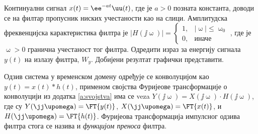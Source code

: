 \PID 
Континуални сигнал $x(t) = \ee^{-at} \uu(t)$, где је $a > 0$ позната константа, 
доводи се на филтар пропусник ниских учестаности као на слици. 
Амплитудска фреквенцијска карактеристика филтра је 
$|H(\jj\upomega)| = \begin{cases}
    1 ,& |\upomega| \leq \upomega_0 \\
    0 ,& \text{иначе}
\end{cases}$, где је $\upomega > 0$ гранична учестаност тог филтра.
Одредити израз за енергију сигнала $y(t)$ на излазу филтра, $W_y$. Добијени резултат
графички представити.

\RESENJE
Одзив система у временском домену одређује се конволуцијом као $y(t) = x(t) \ast h(t)$, применом својства Фуријеове трансформације о конволуцији из додатка 
\ref{a:svojstva} има се veza $Y(\jj\upomega) = X(\jj\upomega) \cdot H(\jj\upomega)$, где су 
$Y(\jj\upomega) = \FT{y(t)}$, $X(\jj\upomega) = \FT{x(t)}$, и $H(\jj\upomega) = \FT{h(t)}$. Фуријеова трансформација импулсног 
одзива филтра стога се назива и \textit{функцијом преноса} филтра.

